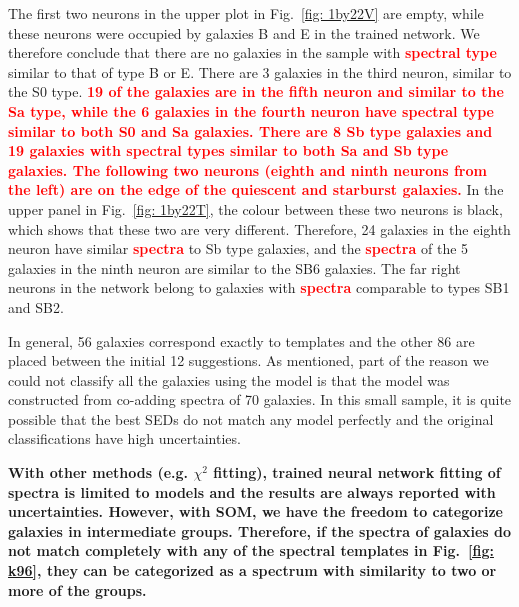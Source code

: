             The first two neurons in the upper plot in Fig.~\ref{fig: 1by22V} are empty, while these neurons were occupied by galaxies B and E in the trained network.
            We therefore conclude that there are no galaxies in the  sample with \textbf{\textcolor{red}{spectral type}} similar to that of type B or E.
            There are 3 galaxies in the third neuron, similar to the S0 type. 
            \textbf{\textcolor{red}{19 of the galaxies are in the fifth neuron and similar to the Sa type, while the 6 galaxies in the fourth neuron have spectral type similar to both S0 and Sa galaxies.
            There are 8 Sb type galaxies and 19 galaxies with spectral types similar to both Sa and Sb type galaxies.
            The following two neurons (eighth and ninth neurons from the left) are on the edge of the quiescent and starburst galaxies.}}
            In the upper panel in Fig.~\ref{fig: 1by22T}, the colour between these two neurons is black, which shows that these two are very different.
            Therefore, 24 galaxies in the eighth neuron have similar \textbf{\textcolor{red}{spectra}} to Sb type galaxies, and the \textbf{\textcolor{red}{spectra}} of the 5 galaxies in the ninth neuron are similar to the SB6 galaxies.
            The far right neurons in the network belong to galaxies with \textbf{\textcolor{red}{spectra}} comparable to types SB1 and SB2.
            
            In general, 56 galaxies correspond exactly to  templates and the other 86 are placed between the initial 12 suggestions.
            As  mentioned, part of the reason we could not classify all the galaxies using the  model is that the model was constructed from co-adding spectra of 70 galaxies.
            In this small sample, it is quite possible that the best SEDs do not match any model perfectly and the original classifications have high uncertainties.
            
           \textbf{With other methods (e.g. $\chi^2$ fitting), trained neural network fitting of spectra is limited to models and the results are always reported with uncertainties.
            However, with SOM, we have the freedom to categorize galaxies in intermediate groups.
            Therefore, if the spectra of galaxies do not match completely with any of the spectral templates in Fig.~\ref{fig: k96}, they can be categorized as a spectrum with similarity to two or more of the groups.}

                        
        
